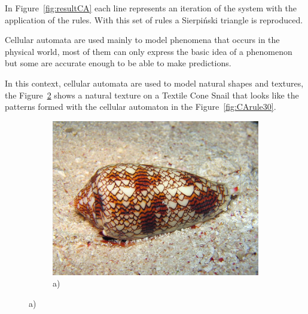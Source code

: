 In Figure~\ref{fig:resultCA} each line represents an iteration of the system with the application of the rules. With this set of rules a Sierpiński triangle is reproduced.

Cellular automata are used mainly to model phenomena that occurs in the physical world, most of them can only express the basic idea of a phenomenon but some are accurate enough to be able to make predictions.

In this context, cellular automata are used to model natural shapes and textures, the Figure~\ref{fig:CAshell} shows a natural texture on a Textile Cone Snail that looks like the patterns formed with the cellular automaton in the Figure~\ref{fig:CArule30}.



\begin{figure}
        \centering
        \begin{subfigure}[b]{0.6\textwidth}
                \includegraphics[width=\textwidth]{img/Theory/Cellular_A/shell.jpeg}
                \caption{a)}
				\label{fig:CAshell}
        \end{subfigure}%


\end{figure}
